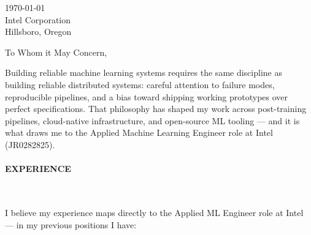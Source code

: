 



\textcolor{my-grey}{\dotfill}
\bigbreak

{\today}\\
Intel Corporation\\
Hillsboro, Oregon

\vspace*{2\baselineskip}

To Whom it May Concern,

\vspace*{\baselineskip}

Building reliable machine learning systems requires the same discipline as building reliable distributed systems: careful attention to failure modes, reproducible pipelines, and a bias toward shipping working prototypes over perfect specifications. That philosophy has shaped my work across post-training pipelines, cloud-native infrastructure, and open-source ML tooling --- and it is what draws me to the Applied Machine Learning Engineer role at Intel (JR0282825).

\paragraph{EXPERIENCE}\

\vspace*{\baselineskip}

I believe my experience maps directly to the Applied ML Engineer role at Intel --- in my previous positions I have:

